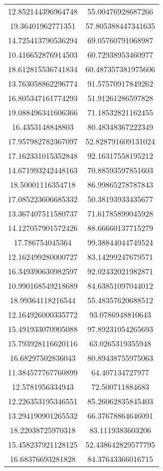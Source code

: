 \begin{table}
\begin{tabular}{cc}
12.852144396964748 & 55.00476928687266 \\
19.36401962771351 & 57.805388447341635 \\
14.725413790536294 & 69.05760791068987 \\
10.416652876914503 & 60.72938953460977 \\
18.612815536741834 & 60.487357381975606 \\
13.763058862296774 & 91.57570917849262 \\
16.805347161774293 & 51.91261286597828 \\
19.088496341606366 & 71.18532821162455 \\
16.4353148848803 & 80.48348367222349 \\
17.957982782367097 & 52.828791609131024 \\
17.162331015352848 & 92.16317558195212 \\
14.671993242448163 & 70.88593597851603 \\
18.50001116354718 & 86.99865278787843 \\
17.085223606685332 & 50.38193933435677 \\
13.367407511580737 & 71.61785899045928 \\
14.127057901572426 & 88.66660137715279 \\
17.786754045364 & 99.38844044749524 \\
12.162499280000727 & 83.14299247679571 \\
16.349390630982597 & 92.02432021982871 \\
10.990168549218689 & 84.63851097044012 \\
18.99364118216544 & 55.48357620688512 \\
12.164926000335772 & 93.0786948810643 \\
15.491933070905088 & 97.89231054265693 \\
15.793928116620116 & 63.0265319355948 \\
16.68297502836043 & 80.89438755975063 \\
11.384577767760899 & 64.407134727977 \\
12.5781956334943 & 72.500711884683 \\
12.226353195346551 & 85.26062835845403 \\
13.294190901265532 & 66.37678864646091 \\
18.22038725970318 & 83.1119383603206 \\
15.458237921128125 & 52.438642829577795 \\
16.68376693281828 & 84.37643366016715 \\

\end{tabular}
\end{table}
